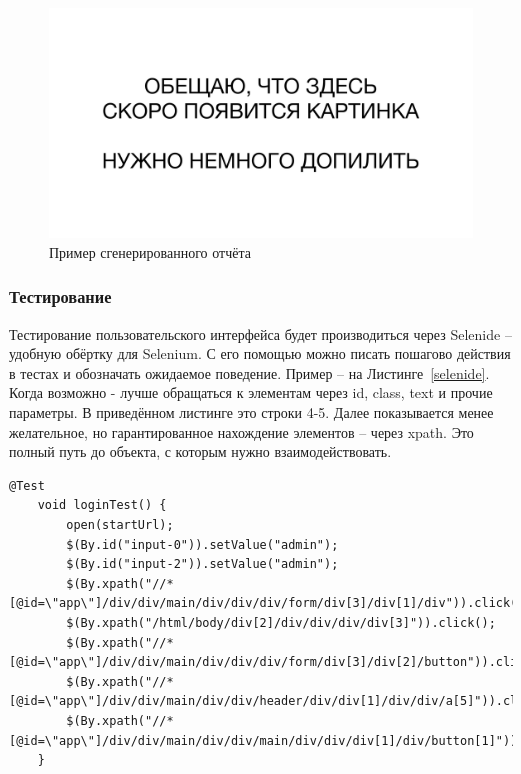 \documentclass[a4paper,article]{article}
\begin{document}
\begin{sloppypar}
    \begin{figure}[h]
        \centering
        \includegraphics[width=0.8\linewidth]{Сгенерированный отчёт.png}        
        \caption{\centering Пример сгенерированного отчёта}        
        \label{fig:report}
    \end{figure}

    \subsubsection{Тестирование}\label{Реализация. Клиентская часть. Тестирование}
    
    Тестирование пользовательского интерфейса будет производиться через Selenide -- удобную обёртку для Selenium. С его помощью можно писать пошагово действия в тестах и обозначать ожидаемое поведение. Пример -- на Листинге~\ref{selenide}. Когда возможно - лучше обращаться к элементам через id, class, text и прочие параметры. В приведённом листинге это строки 4-5. Далее показывается менее желательное, но гарантированное нахождение элементов -- через xpath. Это полный путь до объекта, с которым нужно взаимодействовать.
    
    \begin{lstlisting}[label=selenide,caption=Пример теста на Selenide]
    @Test
    void loginTest() {
        open(startUrl);
        $(By.id("input-0")).setValue("admin");
        $(By.id("input-2")).setValue("admin");
        $(By.xpath("//*[@id=\"app\"]/div/div/main/div/div/div/form/div[3]/div[1]/div")).click();
        $(By.xpath("/html/body/div[2]/div/div/div/div[3]")).click();
        $(By.xpath("//*[@id=\"app\"]/div/div/main/div/div/div/form/div[3]/div[2]/button")).click();
        $(By.xpath("//*[@id=\"app\"]/div/div/main/div/div/header/div/div[1]/div/div/a[5]")).click();
        $(By.xpath("//*[@id=\"app\"]/div/div/main/div/div/main/div/div/div[1]/div/button[1]")).shouldHave(text("СЗДТ"));
    }
    \end{lstlisting}
    

\end{sloppypar}
\end{document}
